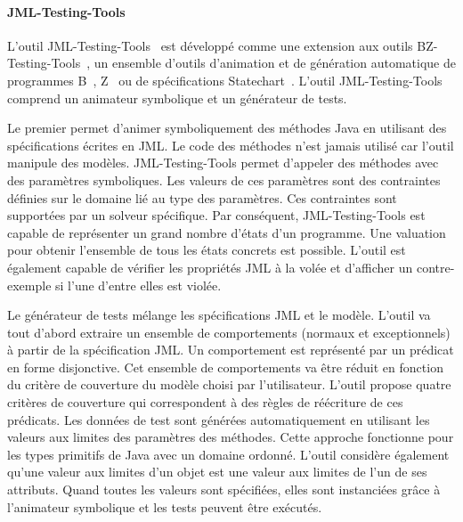 \paragraph{JML-Testing-Tools} L'outil JML-Testing-Tools~ est développé comme une extension aux outils
BZ-Testing-Tools~, un ensemble d'outils d'animation et de
génération automatique de programmes B~, Z~ ou
de spécifications Statechart~. L'outil JML-Testing-Tools comprend
un animateur symbolique et un générateur de tests.

Le premier permet d'animer symboliquement des méthodes Java en utilisant des
spécifications écrites en JML. Le code des méthodes n'est jamais utilisé car
l'outil manipule des modèles. JML-Testing-Tools permet d'appeler des méthodes
avec des paramètres symboliques. Les valeurs de ces paramètres sont des
contraintes définies sur le domaine lié au type des paramètres. Ces contraintes
sont supportées par un solveur spécifique. Par conséquent, JML-Testing-Tools est
capable de représenter un grand nombre d'états d'un programme. Une valuation
pour obtenir l'ensemble de tous les états concrets est possible. L'outil est
également capable de vérifier les propriétés JML à la volée et d'afficher un
contre-exemple si l'une d'entre elles est violée.

Le générateur de tests mélange les spécifications JML et le modèle. L'outil va
tout d'abord extraire un ensemble de comportements (normaux et exceptionnels) à
partir de la spécification JML. Un comportement est représenté par un prédicat
en forme disjonctive. Cet ensemble de comportements va être réduit en fonction
du critère de couverture du modèle choisi par l'utilisateur. L'outil propose
quatre critères de couverture qui correspondent à des règles de réécriture de
ces prédicats. Les données de test sont générées automatiquement en utilisant
les valeurs aux limites des paramètres des méthodes. Cette approche fonctionne
pour les types primitifs de Java avec un domaine ordonné. L'outil considère
également qu'une valeur aux limites d'un objet est une valeur aux limites de
l'un de ses attributs. Quand toutes les valeurs sont spécifiées, elles sont
instanciées grâce à l'animateur symbolique et les tests peuvent être exécutés.


